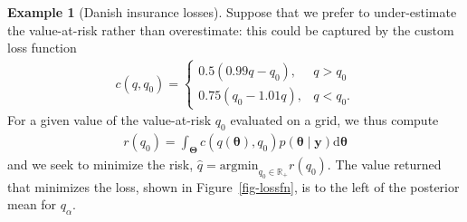 \documentclass[
  11pt,
  letterpaper,
]{scrbook}
\theoremstyle{definition}
\newtheorem{example}{Example}[chapter]
\theoremstyle{definition}
\theoremstyle{definition}
\theoremstyle{plain}
\theoremstyle{remark}
\begin{document}
\begin{example}[Danish insurance
losses]
Suppose that we prefer to under-estimate the value-at-risk rather than
overestimate: this could be captured by the custom loss function
\begin{align*}
c(q, q_0) = 
\begin{cases}
0.5(0.99q - q_0), & q > q_0 \\
0.75(q_0 - 1.01q), & q < q_0.
\end{cases}
\end{align*} For a given value of the value-at-risk \(q_0\) evaluated on
a grid, we thus compute \begin{align*}
 r(q_0) = \int_{\boldsymbol{\Theta}}c(q(\boldsymbol{\theta}), q_0) p (\boldsymbol{\theta} \mid \boldsymbol{y}) \mathrm{d} \boldsymbol{\theta}
\end{align*} and we seek to minimize the risk,
\(\widehat{q} =\mathrm{argmin}_{q_0 \in \mathbb{R}_{+}} r(q_0)\). The
value returned that minimizes the loss, shown in
Figure~\ref{fig-lossfn}, is to the left of the posterior mean for
\(q_\alpha\).


\end{example}
\end{document}
